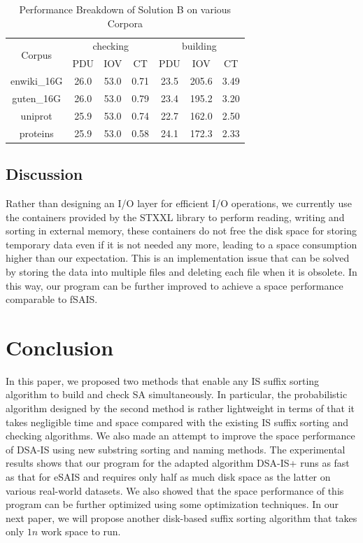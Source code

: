 \documentclass[10pt,journal,compsoc]{IEEEtran}
\begin{document}
\begin{table}%
	\caption{Performance Breakdown of Solution B on various Corpora}
	\label{tbl:breakdown_solutionb}
	\centering
	\begin{tabular}{|c|c|c|c|c|c|c|}
		\hline
		\multirow{2}{*}{Corpus} & \multicolumn{3}{|c}{checking} & \multicolumn{3}{|c|}{building} \\\cline{2-7}
		& PDU & IOV & CT & PDU & IOV & CT \\\hline
		enwiki\_16G & 26.0 & 53.0 & 0.71 & 23.5 & 205.6 & 3.49 \\\hline
		guten\_16G & 26.0 & 53.0 & 0.79 & 23.4 & 195.2 & 3.20 \\\hline
		uniprot & 25.9 & 53.0 & 0.74 & 22.7 & 162.0 & 2.50 \\\hline
		proteins & 25.9 & 53.0 & 0.58 & 24.1 & 172.3 & 2.33 \\\hline
	\end{tabular}
\end{table}%

\subsection{Discussion}

Rather than designing an I/O layer for efficient I/O operations, we currently use the containers provided by the STXXL library to perform reading, writing and sorting in external memory, these containers do not free the disk space for storing temporary data even if it is not needed any more, leading to a space consumption higher than our expectation. This is an implementation issue that can be solved by storing the data into multiple files and deleting each file when it is obsolete. In this way, our program can be further improved to achieve a space performance comparable to fSAIS.

\section{Conclusion} \label{sec:conclusion}

In this paper, we proposed two methods that enable any IS suffix sorting algorithm to build and check SA simultaneously. In particular, the probabilistic algorithm designed by the second method is rather lightweight in terms of that it takes negligible time and space compared with the existing IS suffix sorting and checking algorithms. We also made an attempt to improve the space performance of DSA-IS using new substring sorting and naming methods. The experimental results shows that our program for the adapted algorithm DSA-IS+ runs as fast as that for eSAIS and requires only half as much disk space as the latter on various real-world datasets. We also showed that the space performance of this program can be further optimized using some optimization techniques. In our next paper, we will propose another disk-based suffix sorting algorithm that takes only $1n$ work space to run.





\end{document}
